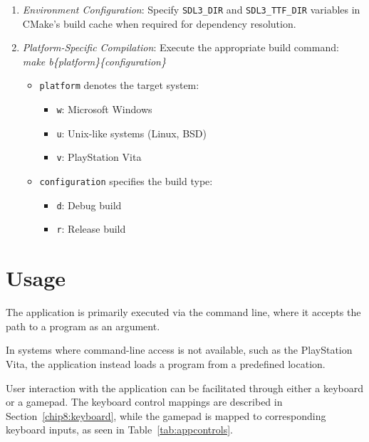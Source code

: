 \begin{enumerate}
    \item \textit{Environment Configuration}: Specify \texttt{SDL3\_DIR} and \texttt{SDL3\_TTF\_DIR} variables in CMake's build cache when required for dependency resolution.
    
    \item \textit{Platform-Specific Compilation}: Execute the appropriate build command:\\\textit{  make b\{platform\}\{configuration\}}
    \begin{itemize}
        \item \texttt{platform} denotes the target system:
        \begin{itemize}
            \item \texttt{w}: Microsoft Windows
            \item \texttt{u}: Unix-like systems (Linux, BSD)
            \item \texttt{v}: PlayStation Vita
        \end{itemize}
        \item \texttt{configuration} specifies the build type:
        \begin{itemize}
            \item \texttt{d}: Debug build
            \item \texttt{r}: Release build
        \end{itemize}
    \end{itemize}
\end{enumerate}

\clearpage

\section{Usage}
\label{sec:ch4sec3}

\par The application is primarily executed via the command line, where it accepts the path to a program as an argument.

\par In systems where command-line access is not available, such as the PlayStation Vita, the application instead loads a program from a predefined location.

\par User interaction with the application can be facilitated through either a keyboard or a gamepad. The keyboard control mappings are described in Section~\ref{chip8:keyboard}, while the gamepad is mapped to corresponding keyboard inputs, as seen in Table~\ref{tab:appcontrols}.

